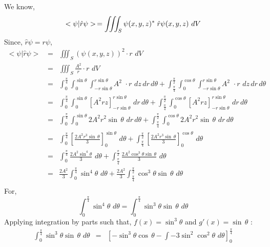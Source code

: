 \documentclass{article}
\begin{document}
\large{

We know,
$$<\psi|\hat{r}\psi> \, = \iiint_S \psi(x,y,z)^*\;\hat{r}\psi(x,y,z) \,\, dV\\ $$
Since, $\hat{r}\psi = r\psi$,\\
\begin{eqnarray*}
        <\psi|\hat{r}\psi> \,&=& \iiint_S (\psi(x,y,z))^2 \cdot r \,\, dV\\
        &=&\iiint_S \frac{A^2}{r} \cdot r \,\, dV\\
        &=&\int_{0}^{\frac{\pi}{4}}\int_{0}^{\sin\theta}\int_{-r\sin\theta}^{r\sin\theta} A^2 \,\, \cdot r\,\,dz\,dr\,d\theta + \int_{\frac{\pi}{4}}^{\frac{\pi}{2}}\int_{0}^{\cos\theta}\int_{-r\sin\theta}^{r\sin\theta} A^2 \,\, \cdot r\,\,dz\,dr\,d\theta \\
        &=& \int_{0}^{\frac{\pi}{4}} \int_{0}^{\sin\theta} [A^2 rz]_{-r\sin\theta}^{r\sin\theta} \,\,dr\,d\theta + \int_{\frac{\pi}{4}}^{\frac{\pi}{2}}\int_{0}^{\cos\theta}  [A^2r z]_{-r\sin\theta}^{r\sin\theta} \,\,dr\,d\theta\\
        &=& \int_{0}^{\frac{\pi}{4}} \int_{0}^{\sin\theta} 2A^2 r^2 \sin\,\theta \,\,dr\,d\theta + \int_{\frac{\pi}{4}}^{\frac{\pi}{2}}\int_{0}^{\cos\theta}  2A^2 r^2 \sin\,\theta  \,\,dr\,d\theta \\
        &=& \int_{0}^{\frac{\pi}{4}} [\frac{2A^2 r^3\sin\,\theta}{3}]_{0}^{\sin\theta}  \,\,d\theta + \int_{\frac{\pi}{4}}^{\frac{\pi}{2}}  [\frac{2A^2 r^3\sin\,\theta}{3}]_{0}^{\cos\theta}  \,\,d\theta \\
        &=& \int_{0}^{\frac{\pi}{4}} \frac{2A^2 \sin^4\theta}{3}  \,\,d\theta + \int_{\frac{\pi}{4}}^{\frac{\pi}{2}} \frac{ 2A^2 \cos^3\theta \sin\,\theta }{3}  \,\,d\theta \\
        &=& \frac{2A^2 }{3} \int_{0}^{\frac{\pi}{4}} \sin^4\theta  \,\,d\theta + \frac{ 2A^2 }{3}\int_{\frac{\pi}{4}}^{\frac{\pi}{2}} \cos^3\theta \sin\,\theta  \,\,d\theta \\
\end{eqnarray*}
For,
$$\int_{0}^{\frac{\pi}{4}} \sin^4\theta  \,\,d\theta  = \int_{0}^{\frac{\pi}{4}} \sin^3\theta \sin\,\theta  \,\,d\theta $$
Applying integration by parts such that, $f(x) = \sin^3 \theta$ and $g'(x) = \sin\,\theta$ :
\begin{eqnarray*}
       \int_{0}^{\frac{\pi}{4}} \sin^3\theta \sin\,\theta  \,\,d\theta &=& [-\sin^3\theta     \cos \,\theta - \int -3\sin^2\cos^2\theta \,\, d\theta]_{0}^{\frac{\pi}{4}}\\
\end{eqnarray*}
}
\end{document}
